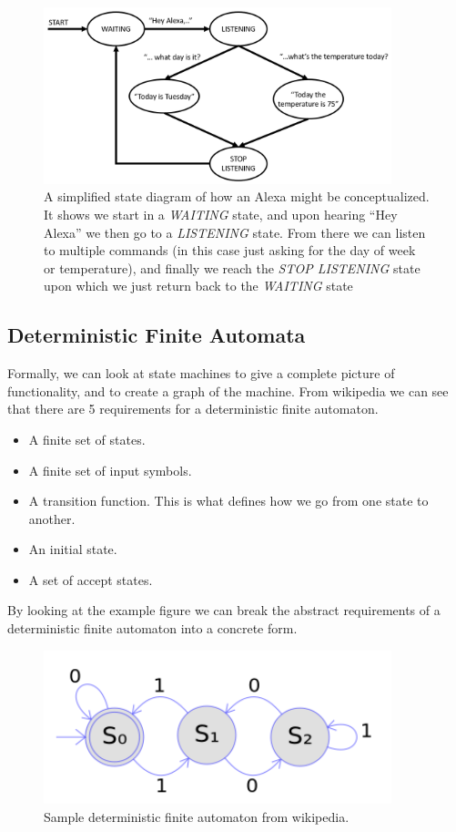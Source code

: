 \documentclass{article}
\begin{document}
\begin{figure}[!h]
\centering
\includegraphics[width=0.9\textwidth]{./figs/alexa.png}
\caption{A simplified state diagram of how an Alexa might be conceptualized. It shows we start in a \textit{WAITING} state, and upon hearing ``Hey Alexa'' we then go to a \textit{LISTENING} state. From there we can listen to multiple commands (in this case just asking for the day of week or temperature), and finally we reach the \textit{STOP LISTENING} state upon which we just return back to the \textit{WAITING} state}
\label{fig:alexa}
\end{figure}

\subsection{Deterministic Finite Automata}
\label{subsect:DFA}
Formally, we can look at state machines to give a complete picture of functionality, and to create a graph of the machine. From wikipedia we can see that there are 5 requirements for a deterministic finite automaton.

\begin{itemize}
\item A finite set of states.
\item A finite set of input symbols.
\item A transition function. This is what defines how we go from one state to another.
\item An initial state.
\item A set of accept states.
\end{itemize}

By looking at the example figure we can break the abstract requirements of a deterministic finite automaton into a concrete form. 

\begin{figure}[!h]
\centering
\includegraphics[width=0.9\textwidth]{./figs/DFA.png}
\caption{Sample deterministic finite automaton from wikipedia.}
\label{fig:DFA}
\end{figure}
\end{document}

